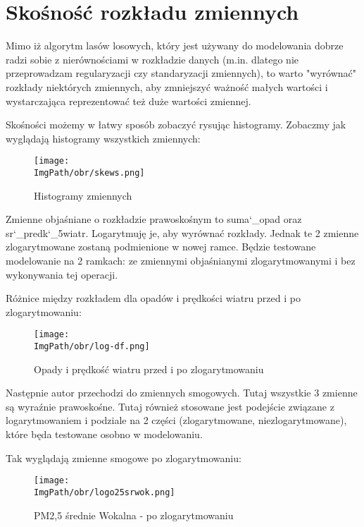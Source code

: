 \documentclass[a4paper,12pt,twoside,openany]{report}
\newcommand{\ImgPath}{.}
\begin{document}
\section{Skośność rozkładu zmiennych}

Mimo iż algorytm lasów losowych, który jest używany do modelowania dobrze radzi sobie z nierównościami w rozkładzie danych (m.in. dlatego nie przeprowadzam regularyzacji czy standaryzacji zmiennych), to warto "wyrównać" rozkłady niektórych zmiennych, aby zmniejszyć ważność małych wartości i wystarczająca reprezentować też duże wartości zmiennej.

Skośności możemy w łatwy sposób zobaczyć rysując histogramy. Zobaczmy jak wyglądają histogramy wszystkich zmiennych:

\begin{figure}[H]
	\begin{center}
		\centering
		\texttt{[image: \\ImgPath/obr/skews.png]}
	\end{center}
	\caption{Histogramy zmiennych}
	\label{skews}
\end{figure}

Zmienne objaśniane o rozkładzie prawoskośnym to suma\char`_opad oraz sr\char`_predk\char`_5wiatr. Logarytmuję je, aby wyrównać rozkłady. Jednak te 2 zmienne zlogarytmowane zostaną podmienione w nowej ramce. Będzie testowane modelowanie na 2 ramkach: ze zmiennymi objaśnianymi zlogarytmowanymi i bez wykonywania tej operacji.

Różnice między rozkładem dla opadów i prędkości wiatru przed i po zlogarytmowaniu:

\begin{figure}[H]
	\begin{center}
		\centering
		\texttt{[image: \\ImgPath/obr/log-df.png]}
	\end{center}
	\caption{Opady i prędkość wiatru przed i po zlogarytmowaniu}
	\label{log-df}
\end{figure}

Następnie autor przechodzi do zmiennych smogowych. Tutaj wszystkie 3 zmienne są wyraźnie prawoskośne. Tutaj również stosowane jest podejście związane z logarytmowaniem i podziale na 2 części (zlogarytmowane, niezlogarytmowane), które będa testowane osobno w modelowaniu.

Tak wyglądają zmienne smogowe po zlogarytmowaniu:

\begin{figure}[H]
	\begin{center}
		\centering
		\texttt{[image: \\ImgPath/obr/logo25srwok.png]}
	\end{center}
	\caption{PM2,5 średnie Wokalna - po zlogarytmowaniu}
	\label{logo25srwok}
\end{figure}
\end{document}
